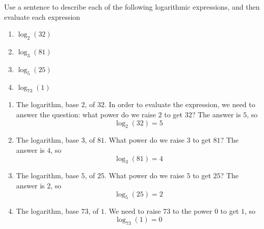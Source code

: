 \begin{pccexample}
	Use a sentence to describe each of the following logarithmic expressions, and 
	then evaluate each expression
	\begin{multicols}{4}
		\begin{enumerate}
			\item $\log_2(32)$
			\item $\log_3(81)$
			\item $\log_5(25)$
			\item $\log_{73}(1)$
		\end{enumerate}
	\end{multicols}
	\begin{pccsolution}
		\begin{enumerate}
			\item The logarithm, base $2$, of $32$. In order to evaluate the expression, we need 
			to answer the question: what power do we raise $2$ to get $32$? The answer is $5$, so
			\[
				\log_2(32)=5
			\]
			\item The logarithm, base $3$, of $81$. What power do we raise $3$ to get $81$? The 
			answer is $4$, so
			\[
				\log_3(81)=4
			\]
			\item The logarithm, base $5$, of $25$. What power do we raise $5$ to get $25$? The 
			answer is $2$, so
			\[
				\log_5(25)=2
			\]
			\item The logarithm, base $73$, of $1$. We need to raise $73$ to the power $0$ 
			to get $1$, so
			\[
				\log_{73}(1)=0
			\]
		\end{enumerate}
	\end{pccsolution}
\end{pccexample}

